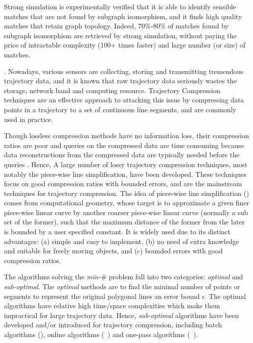 Strong simulation is experimentally verified that it is able to identify sensible matches that are not found by subgraph isomorphism, and it finds high
quality matches that retain graph topology. Indeed, 70\%-80\% of matches found by subgraph
isomorphism are retrieved by strong simulation, without paying the price of intractable complexity (100+ times faster) and large number (or
size) of matches.



. Nowadays, various sensors are collecting, storing and transmitting
tremendous trajectory data, and it is known that raw trajectory data seriously wastes the storage, network
band and computing resource.  Trajectory Compression techniques are an effective approach to attacking this issue by
compressing data points in a trajectory to a set of continuous
line segments, and are commonly used in practice.

 Though lossless compression methods have no information loss, their compression ratios are poor and queries on the compressed data are time consuming because data reconstructions from the compressed data are typically needed before the queries \cite{Nibali:Trajic} .
Hence, A large number of lossy trajectory compression techniques, most notably the piece-wise line simplification, have been developed.
These techniques focus on good compression ratios with bounded errors, and are the mainstream techniques for trajectory compression.
The idea of piece-wise line simplification (\lsa) comes from computational geometry, whose target is to approximate a given finer piece-wise linear curve by another coarser piece-wise linear curve ({normally} a sub set of the former), such that the maximum distance of the former from the later is bounded by a user specified constant. It is widely used due to its distinct advantages: (a) simple and easy to implement, (b) no need of extra knowledge and suitable for freely  moving  objects, and (c) bounded errors with good compression ratios.


The \lsa algorithms solving the \emph{min-$\#$} problem fall into two categories: {\em optimal} and {\em sub-optimal}.
The \textit{optimal} methods\cite{Imai:Optimal} are to find the minimal number of points or segments to represent the original polygonal lines \wrt an error bound $\epsilon$. The optimal \lsa algorithms have relative high time/space complexities which make them impractical for large trajectory data.
Hence, \textit{sub-optimal} \lsa algorithms have been developed and/or introduced for trajectory compression, including batch algorithms (\eg \cite{Douglas:Peucker}), online algorithms (\eg~\cite{Liu:BQS}) and one-pass algorithms (\eg~\cite{LinMZWH17}).


